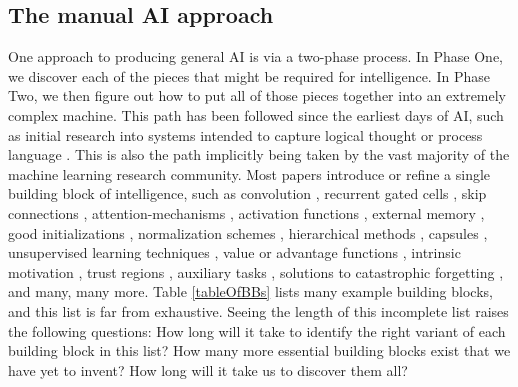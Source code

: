 \documentclass{article}
\begin{document}
\subsection{The manual AI approach}
\label{manualApproach}
One approach to producing general AI is via a two-phase process. In Phase One, we discover each of the pieces that might be required for intelligence. In Phase Two, we then figure out how to put all of those pieces together into an extremely complex machine. This path has been followed since the earliest days of AI, such as initial research into systems intended to capture logical thought or process language \cite{russell1995artificial}. 
This is also the path implicitly being taken by the vast majority of the machine learning research community. Most papers introduce or refine a single building block of intelligence, such as convolution \cite{lecun1998gradient}, recurrent gated cells \cite{hochreiter:nc97,cho2014properties, chung2014empirical}, skip connections \cite{he2015deep,srivastava2015highway}, 
attention-mechanisms \cite{xu2015show,devlin2018bert},
activation functions \cite{Goodfellow-et-al-2016,hahnloser2000digital,nair2010rectified,maas2013rectifier,clevert2015fast},
external memory \cite{graves2016hybrid,weston2014memory},
good initializations \cite{glorot2010understanding,Goodfellow-et-al-2016},
normalization schemes \cite{ioffe2015batch,lei2016layer},
hierarchical methods \cite{dayan1993feudal,barto2003recent,hausman2018learning,vezhnevets2017feudal},
capsules \cite{sabour2017dynamic,hinton2011transforming},
unsupervised learning techniques \cite{Goodfellow-et-al-2016,radford2015unsupervised,le2011building,goodfellow2014generative},
value or advantage functions \cite{sutton1998reinforcement}, 
intrinsic motivation \cite{stanton2018deepCS,pathak2017curiosity,oudeyer2009intrinsic,burda2018large}, 
trust regions \cite{schulman2015trust},
auxiliary tasks \cite{jaderberg2016reinforcement}, 
solutions to catastrophic forgetting \cite{kirkpatrick2017overcoming, ellefsen2015neural, zenke2017continual,velez2017diffusion}, and many, many more. Table \ref{tableOfBBs} lists many example building blocks, and this list is far from exhaustive. Seeing the length of this incomplete list raises the following questions: How long will it take to identify the right variant of each building block in this list? How many more essential building blocks exist that we have yet to invent? How long will it take us to discover them all? 
\end{document}

